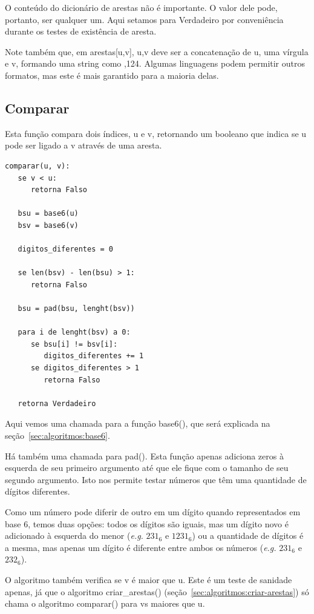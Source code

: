\documentclass[12pt]{article}
\begin{document}
O conteúdo do dicionário de arestas não é importante. O valor dele pode, portanto, ser qualquer um. Aqui setamos para {\sf Verdadeiro} por conveniência durante os testes de existência de aresta.

Note também que, em {\sf arestas[u,v]}, {\sf u,v} deve ser a concatena\c{c}ão de {\sf u}, uma vírgula e {\sf v}, formando uma string como {,124}. Algumas linguagens podem permitir outros formatos, mas este é mais garantido para a maioria delas.

\subsection{Comparar}\label{sec:algoritmos:comparar}
Esta fun\c{c}ão compara dois índices, {\sf u} e {\sf v}, retornando um booleano que indica se {\sf u} pode ser ligado a {\sf v} através de uma aresta.
\begin{lstlisting}
comparar(u, v):
   se v < u:
      retorna Falso

   bsu = base6(u)
   bsv = base6(v)

   digitos_diferentes = 0

   se len(bsv) - len(bsu) > 1:
      retorna Falso

   bsu = pad(bsu, lenght(bsv))

   para i de lenght(bsv) a 0:
      se bsu[i] != bsv[i]:
         digitos_diferentes += 1
      se digitos_diferentes > 1
         retorna Falso

   retorna Verdadeiro
\end{lstlisting}

Aqui vemos uma chamada para a fun\c{c}ão {\sf base6()}, que será explicada na se\c{c}ão~\ref{sec:algoritmos:base6}.

Há também uma chamada para {\sf pad()}. Esta fun\c{c}ão apenas adiciona zeros à esquerda de seu primeiro argumento até que ele fique com o tamanho de seu segundo argumento. Isto nos permite testar números que têm uma quantidade de dígitos diferentes.

Como um número pode diferir de outro em um dígito quando representados em base 6, temos duas op\c{c}ões: todos os dígitos são iguais, mas um dígito novo é adicionado à esquerda do menor (\textit{e.g.} $231_6$ e $1231_6$) ou a quantidade de dígitos é a mesma, mas apenas um dígito é diferente entre ambos os números (\textit{e.g.} $231_6$ e $232_6$).

O algoritmo também verifica se {\sf v} é maior que {\sf u}. Este é um teste de sanidade apenas, já que o algoritmo {\sf criar\_arestas()} (se\c{c}ão~\ref{sec:algoritmos:criar-arestas}) só chama o algoritmo {\sf comparar()} para {\sf v}s maiores que {\sf u}.
\end{document}
